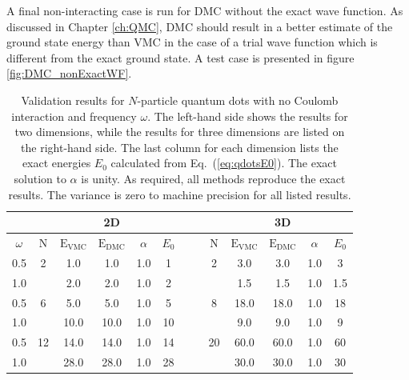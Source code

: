 A final non-interacting case is run for DMC without the exact wave function. As discussed in Chapter \ref{ch:QMC}, DMC should result in a better estimate of the ground state energy than VMC in the case of a trial wave function which is different from the exact ground state. A test case is presented in figure \ref{fig:DMC_nonExactWF}.

\setlength{\tabcolsep}{0.3cm}
\begin{table}[h]
\begin{center}
\begin{tabular}{c|cccccc||cccccc}
 & & & 2D & & & & & & & 3D \\
\hline
  $\omega$   & N & $\mathrm{E_{VMC}}$ & $\mathrm{E_{DMC}}$ & $\alpha$ & $E_0$ & \qquad  & \qquad &  N   & $\mathrm{E_{VMC}}$ & $\mathrm{E_{DMC}}$ & $\alpha$ & $E_0$ \\
\hline
 0.5 &   2   &   1.0    &   1.0    &   1.0    & 1  & \qquad & \qquad & 2     &   3.0   &   3.0    &   1.0    & 3 \\
 1.0 &       &   2.0    &   2.0    &   1.0    & 2  & \qquad & \qquad &       &   1.5   &   1.5    &   1.0    & 1.5 \\
 0.5 &   6   &   5.0    &   5.0    &   1.0    & 5  & \qquad & \qquad &  8    &   18.0  &   18.0   &   1.0    & 18 \\
 1.0 &       &   10.0   &   10.0   &   1.0    & 10 & \qquad & \qquad &       &  9.0    &   9.0    &   1.0    & 9 \\
 0.5 &   12  &   14.0   &   14.0   &   1.0    & 14 & \qquad & \qquad & 20    &  60.0   &   60.0   &   1.0    & 60 \\
 1.0 &       &   28.0   &   28.0   &   1.0    & 28 & \qquad & \qquad &       &  30.0   &   30.0   &   1.0    & 30 \\
\end{tabular}
\caption{Validation results for $N$-particle quantum dots with no Coulomb interaction and frequency $\omega$. The left-hand side shows the results for two dimensions, while the results for three dimensions are listed on the right-hand side. The last column for each dimension lists the exact energies $E_0$ calculated from Eq.~(\ref{eq:qdotsE0}). The exact solution to $\alpha$ is unity. As required, all methods reproduce the exact results. The variance is zero to machine precision for all listed results.}
\label{tab:res_valid_qdots}
\end{center}
\end{table}
\setlength{\tabcolsep}{6pt}

